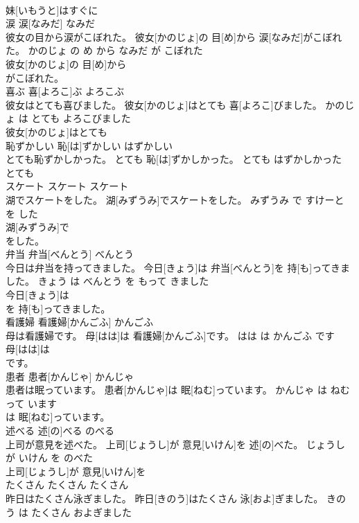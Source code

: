 \documentclass[8pt]{extreport}
\begin{document}
\begin{CJK}{UTF8}{min}
\\	妹[いもうと]はすぐに
\\	涙	涙[なみだ]	なみだ	
\\	彼女の目から涙がこぼれた。	彼女[かのじょ]の 目[め]から 涙[なみだ]がこぼれた。	かのじょ の め から なみだ が こぼれた	
\\	彼女[かのじょ]の 目[め]から
\\	がこぼれた。			
\\	喜ぶ	喜[よろこ]ぶ	よろこぶ	
\\	彼女はとても喜びました。	彼女[かのじょ]はとても 喜[よろこ]びました。	かのじょ は とても よろこびました	
\\	彼女[かのじょ]はとても
\\	恥ずかしい	恥[は]ずかしい	はずかしい	
\\	とても恥ずかしかった。	とても 恥[は]ずかしかった。	とても はずかしかった	
\\	とても
\\	スケート	スケート	スケート	
\\	湖でスケートをした。	湖[みずうみ]でスケートをした。	みずうみ で すけーと を した	
\\	湖[みずうみ]で
\\	をした。			
\\	弁当	弁当[べんとう]	べんとう	
\\	今日は弁当を持ってきました。	今日[きょう]は 弁当[べんとう]を 持[も]ってきました。	きょう は べんとう を もって きました	
\\	今日[きょう]は
\\	を 持[も]ってきました。			
\\	看護婦	看護婦[かんごふ]	かんごふ	
\\	母は看護婦です。	母[はは]は 看護婦[かんごふ]です。	はは は かんごふ です	
\\	母[はは]は
\\	です。			
\\	患者	患者[かんじゃ]	かんじゃ	
\\	患者は眠っています。	患者[かんじゃ]は 眠[ねむ]っています。	かんじゃ は ねむって います	
\\	は 眠[ねむ]っています。			
\\	述べる	述[の]べる	のべる	
\\	上司が意見を述べた。	上司[じょうし]が 意見[いけん]を 述[の]べた。	じょうし が いけん を のべた	
\\	上司[じょうし]が 意見[いけん]を
\\	たくさん	たくさん	たくさん	
\\	昨日はたくさん泳ぎました。	昨日[きのう]はたくさん 泳[およ]ぎました。	きのう は たくさん およぎました	

\end{CJK}
\end{document}
